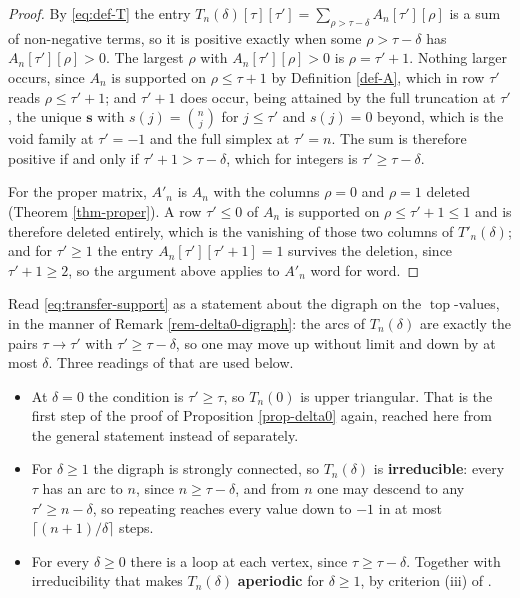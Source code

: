 \documentclass[11pt, a4paper, abstract=yes]{scrartcl}
\theoremstyle{definition}
\theoremstyle{remark}
\theoremstyle{plain}
\newcommand{\vek}[1]{\boldsymbol{#1}}
\newcommand{\tp}{\operatorname{top}}
\begin{document}
\begin{proof}
By \eqref{eq:def-T} the entry \(T_n(\delta)[\tau][\tau']=\sum_{\rho>\tau-\delta}A_n[\tau'][\rho]\)
is a sum of non-negative terms, so it is positive exactly when some \(\rho>\tau-\delta\) has
\(A_n[\tau'][\rho]>0\). The largest \(\rho\) with \(A_n[\tau'][\rho]>0\) is \(\rho=\tau'+1\).
Nothing larger occurs, since \(A_n\) is supported on \(\rho\le\tau+1\) by Definition \ref{def-A},
which in row \(\tau'\) reads \(\rho\le\tau'+1\); and \(\tau'+1\) does occur, being attained by the
full truncation at \(\tau'\), the unique \(\vek s\) with \(s(j)=\binom nj\) for \(j\le\tau'\) and
\(s(j)=0\) beyond, which is the void family at \(\tau'=-1\) and the full simplex at \(\tau'=n\).
The sum is therefore positive if and only if \(\tau'+1>\tau-\delta\), which for integers is
\(\tau'\ge\tau-\delta\).

For the proper matrix, \(A'_n\) is \(A_n\) with the columns \(\rho=0\) and \(\rho=1\) deleted
(Theorem \ref{thm-proper}). A row \(\tau'\le0\) of \(A_n\) is supported on \(\rho\le\tau'+1\le1\) and
is therefore deleted entirely, which is the vanishing of those two columns of \(T'_n(\delta)\); and
for \(\tau'\ge1\) the entry \(A_n[\tau'][\tau'+1]=1\) survives the deletion, since \(\tau'+1\ge2\),
so the argument above applies to \(A'_n\) word for word.
\end{proof}

Read \eqref{eq:transfer-support} as a statement about the digraph on the \(\tp\)-values, in the
manner of Remark \ref{rem-delta0-digraph}: the arcs of \(T_n(\delta)\) are exactly the pairs
\(\tau\to\tau'\) with \(\tau'\ge\tau-\delta\), so one may move up without limit and down by at most
\(\delta\). Three readings of that are used below.

\begin{itemize}
\item At \(\delta=0\) the condition is \(\tau'\ge\tau\), so \(T_n(0)\) is upper triangular. That is the
first step of the proof of Proposition \ref{prop-delta0} again, reached here from the general
statement instead of separately.
\item For \(\delta\ge1\) the digraph is strongly connected, so \(T_n(\delta)\) is \textbf{irreducible}: every
\(\tau\) has an arc to \(n\), since \(n\ge\tau-\delta\), and from \(n\) one may descend to any
\(\tau'\ge n-\delta\), so repeating reaches every value down to \(-1\) in at most
\(\lceil(n+1)/\delta\rceil\) steps.
\item For every \(\delta\ge0\) there is a loop at each vertex, since \(\tau\ge\tau-\delta\). Together
with irreducibility that makes \(T_n(\delta)\) \textbf{aperiodic} for \(\delta\ge1\), by criterion (iii)
of \autocite[Note V.31]{FlajoletSedgewick2009}.
\end{itemize}
\end{document}

